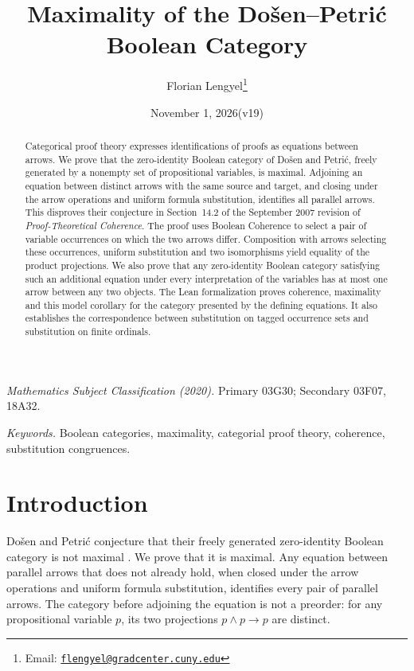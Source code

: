 \documentclass[11pt]{article}
\title{Maximality of the Do\v{s}en--Petri\'c Boolean Category}
\author{Florian Lengyel\thanks{Email: \href{mailto:flengyel@gradcenter.cuny.edu}{\texttt{flengyel@gradcenter.cuny.edu}}}}
\date{November 1, 2026\quad(v19)}
\begin{document}
\maketitle

\begin{abstract}
Categorical proof theory expresses identifications of proofs as
equations between arrows. We prove that the zero-identity Boolean
category of Do\v{s}en and Petri\'c, freely generated by a nonempty set
of propositional variables, is maximal. Adjoining an equation between
distinct arrows with the same source and target, and closing under
the arrow operations and uniform formula substitution, identifies
all parallel arrows. This disproves their conjecture in Section~14.2
of the September 2007 revision of \emph{Proof-Theoretical Coherence}.
The proof uses Boolean Coherence to select a pair of variable
occurrences on which the two arrows differ. Composition with arrows
selecting these occurrences, uniform substitution and two
isomorphisms yield equality of the product projections. We also
prove that any zero-identity Boolean category satisfying such an
additional equation under every interpretation of the variables has
at most one arrow between any two objects. The Lean formalization
proves coherence, maximality and this model corollary for the category
presented by the defining equations. It also establishes the
correspondence between substitution on tagged occurrence sets and
substitution on finite ordinals.
\end{abstract}

\medskip
\noindent\textit{Mathematics Subject Classification (2020).}
Primary 03G30; Secondary 03F07, 18A32.

\smallskip
\noindent\textit{Keywords.} Boolean categories, maximality, categorial proof theory,
coherence, substitution congruences.

\section{Introduction}

Do\v{s}en and Petri\'c conjecture that their freely generated
zero-identity Boolean category is not maximal
\cite[\S14.2, p.~322]{DP}. We prove that it is maximal. Any equation
between parallel arrows that does not already hold, when closed under
the arrow operations and uniform formula substitution, identifies
every pair of parallel arrows. The category before adjoining the
equation is not a preorder: for any propositional variable $p$, its
two projections $p\wedge p\to p$ are distinct.
\end{document}
